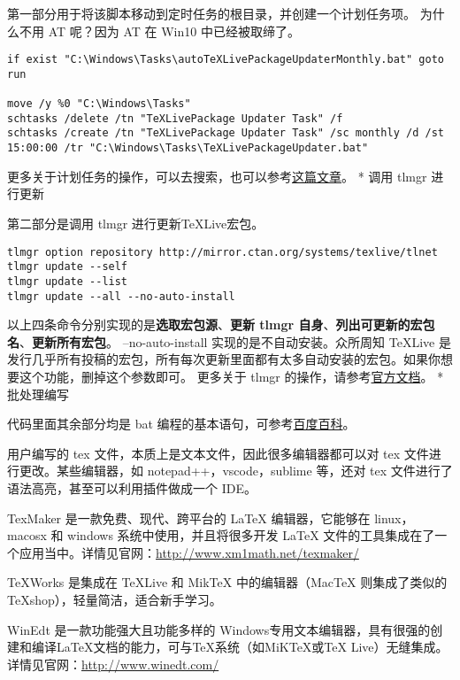 第一部分用于将该脚本移动到定时任务的根目录，并创建一个计划任务项。
为什么不用 AT 呢？因为 AT 在 Win10 中已经被取缔了。

\begin{verbatim}
if exist "C:\Windows\Tasks\autoTeXLivePackageUpdaterMonthly.bat" goto run

move /y %0 "C:\Windows\Tasks"
schtasks /delete /tn "TeXLivePackage Updater Task" /f
schtasks /create /tn "TeXLivePackage Updater Task" /sc monthly /d /st 15:00:00 /tr "C:\Windows\Tasks\TeXLivePackageUpdater.bat"
\end{verbatim}

更多关于计划任务的操作，可以去搜索，也可以参考\href{https://www.flighty.cn/html/tutorial/20170406_442.html}{这篇文章}。
* 调用 tlmgr 进行更新

第二部分是调用 tlmgr 进行更新TeXLive宏包。

\begin{verbatim}
tlmgr option repository http://mirror.ctan.org/systems/texlive/tlnet
tlmgr update --self
tlmgr update --list
tlmgr update --all --no-auto-install
\end{verbatim}

以上四条命令分别实现的是\textbf{选取宏包源}、\textbf{更新 tlmgr
自身}、\textbf{列出可更新的宏包名}、\textbf{更新所有宏包}。
--no-auto-install 实现的是不自动安装。众所周知 TeXLive
是发行几乎所有投稿的宏包，所有每次更新里面都有太多自动安装的宏包。如果你想要这个功能，删掉这个参数即可。
更多关于 tlmgr
的操作，请参考\href{https://www.tug.org/texlive/doc/tlmgr.html}{官方文档}。
* 批处理编写

代码里面其余部分均是 bat
编程的基本语句，可参考\href{https://baike.baidu.com/item/\%E6\%89\%B9\%E5\%A4\%84\%E7\%90\%86/1448600?fr=aladdin}{百度百科}。



用户编写的 tex 文件，本质上是文本文件，因此很多编辑器都可以对 tex
文件进行更改。某些编辑器，如 notepad++，vscode，sublime 等，还对 tex
文件进行了语法高亮，甚至可以利用插件做成一个 IDE。

TexMaker 是一款免费、现代、跨平台的 LaTeX 编辑器，它能够在 linux，macosx 和
windows 系统中使用，并且将很多开发 LaTeX
文件的工具集成在了一个应用当中。详情见官网：\url{http://www.xm1math.net/texmaker/}

TeXWorks 是集成在 TeXLive 和 MikTeX 中的编辑器（MacTeX 则集成了类似的
TeXshop），轻量简洁，适合新手学习。

WinEdt 是一款功能强大且功能多样的
Windows专用文本编辑器，具有很强的创建和编译LaTeX文档的能力，可与TeX系统（如MiKTeX或TeX Live）无缝集成。详情见官网：\url{http://www.winedt.com/}

